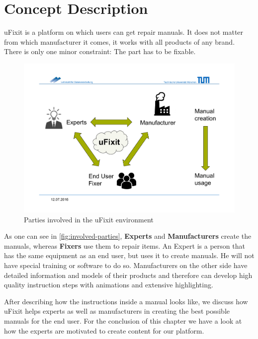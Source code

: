 
\chapter{Concept Description}

	uFixit is a platform on which users can get repair manuals. It does not matter from which manufacturer it comes, it works with all products of any brand. There is only one minor constraint: The part has to be fixable.
	
	\begin{figure}[H]
		\includegraphics[width=\textwidth, trim=0cm 3cm 0cm 4cm, clip]{../images/involved-parties.pdf}
		\centering
		\caption{Parties involved in the uFixit environment}
		\label{fig:involved-parties}
	\end{figure}

	As one can see in \autoref{fig:involved-parties}, \textbf{Experts} and \textbf{Manufacturers} create the manuals, whereas \textbf{Fixers} use them to repair items. An Expert is a person that has the same equipment as an end user, but uses it to create manuals. He will not have special training or software to do so. Manufacturers on the other side have detailed information and models of their products and therefore can develop high quality instruction steps with animations and extensive highlighting.
	
	After describing how the instructions inside a manual looks like, we discuss how uFixit helps experts as well as manufacturers in creating the best possible manuals for the end user. For the conclusion of this chapter we have a look at how the experts are motivated to create content for our platform.



